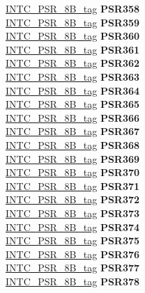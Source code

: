 \begin{DoxyCompactItemize}
\begin{tabbing}
\>\>\mbox{\hyperlink{unionINTC__PSR__8B__tag}{INTC\_PSR\_8B\_tag}} {\bfseries PSR358}\\
\>\>\mbox{\hyperlink{unionINTC__PSR__8B__tag}{INTC\_PSR\_8B\_tag}} {\bfseries PSR359}\\
\>\>\mbox{\hyperlink{unionINTC__PSR__8B__tag}{INTC\_PSR\_8B\_tag}} {\bfseries PSR360}\\
\>\>\mbox{\hyperlink{unionINTC__PSR__8B__tag}{INTC\_PSR\_8B\_tag}} {\bfseries PSR361}\\
\>\>\mbox{\hyperlink{unionINTC__PSR__8B__tag}{INTC\_PSR\_8B\_tag}} {\bfseries PSR362}\\
\>\>\mbox{\hyperlink{unionINTC__PSR__8B__tag}{INTC\_PSR\_8B\_tag}} {\bfseries PSR363}\\
\>\>\mbox{\hyperlink{unionINTC__PSR__8B__tag}{INTC\_PSR\_8B\_tag}} {\bfseries PSR364}\\
\>\>\mbox{\hyperlink{unionINTC__PSR__8B__tag}{INTC\_PSR\_8B\_tag}} {\bfseries PSR365}\\
\>\>\mbox{\hyperlink{unionINTC__PSR__8B__tag}{INTC\_PSR\_8B\_tag}} {\bfseries PSR366}\\
\>\>\mbox{\hyperlink{unionINTC__PSR__8B__tag}{INTC\_PSR\_8B\_tag}} {\bfseries PSR367}\\
\>\>\mbox{\hyperlink{unionINTC__PSR__8B__tag}{INTC\_PSR\_8B\_tag}} {\bfseries PSR368}\\
\>\>\mbox{\hyperlink{unionINTC__PSR__8B__tag}{INTC\_PSR\_8B\_tag}} {\bfseries PSR369}\\
\>\>\mbox{\hyperlink{unionINTC__PSR__8B__tag}{INTC\_PSR\_8B\_tag}} {\bfseries PSR370}\\
\>\>\mbox{\hyperlink{unionINTC__PSR__8B__tag}{INTC\_PSR\_8B\_tag}} {\bfseries PSR371}\\
\>\>\mbox{\hyperlink{unionINTC__PSR__8B__tag}{INTC\_PSR\_8B\_tag}} {\bfseries PSR372}\\
\>\>\mbox{\hyperlink{unionINTC__PSR__8B__tag}{INTC\_PSR\_8B\_tag}} {\bfseries PSR373}\\
\>\>\mbox{\hyperlink{unionINTC__PSR__8B__tag}{INTC\_PSR\_8B\_tag}} {\bfseries PSR374}\\
\>\>\mbox{\hyperlink{unionINTC__PSR__8B__tag}{INTC\_PSR\_8B\_tag}} {\bfseries PSR375}\\
\>\>\mbox{\hyperlink{unionINTC__PSR__8B__tag}{INTC\_PSR\_8B\_tag}} {\bfseries PSR376}\\
\>\>\mbox{\hyperlink{unionINTC__PSR__8B__tag}{INTC\_PSR\_8B\_tag}} {\bfseries PSR377}\\
\>\>\mbox{\hyperlink{unionINTC__PSR__8B__tag}{INTC\_PSR\_8B\_tag}} {\bfseries PSR378}\\

\end{tabbing}
\end{DoxyCompactItemize}
